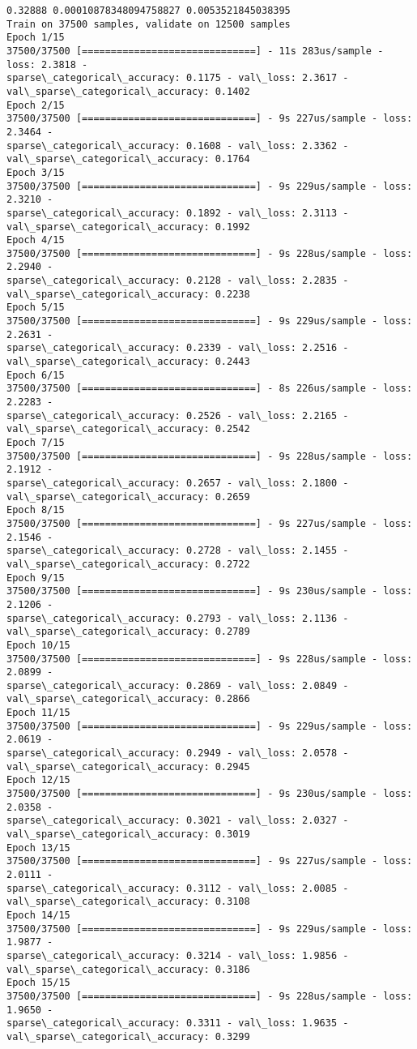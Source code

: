 \documentclass[11pt]{article}
\begin{document}
    \begin{Verbatim}[commandchars=\\\{\}]
0.32888 0.00010878348094758827 0.0053521845038395
Train on 37500 samples, validate on 12500 samples
Epoch 1/15
37500/37500 [==============================] - 11s 283us/sample - loss: 2.3818 -
sparse\_categorical\_accuracy: 0.1175 - val\_loss: 2.3617 -
val\_sparse\_categorical\_accuracy: 0.1402
Epoch 2/15
37500/37500 [==============================] - 9s 227us/sample - loss: 2.3464 -
sparse\_categorical\_accuracy: 0.1608 - val\_loss: 2.3362 -
val\_sparse\_categorical\_accuracy: 0.1764
Epoch 3/15
37500/37500 [==============================] - 9s 229us/sample - loss: 2.3210 -
sparse\_categorical\_accuracy: 0.1892 - val\_loss: 2.3113 -
val\_sparse\_categorical\_accuracy: 0.1992
Epoch 4/15
37500/37500 [==============================] - 9s 228us/sample - loss: 2.2940 -
sparse\_categorical\_accuracy: 0.2128 - val\_loss: 2.2835 -
val\_sparse\_categorical\_accuracy: 0.2238
Epoch 5/15
37500/37500 [==============================] - 9s 229us/sample - loss: 2.2631 -
sparse\_categorical\_accuracy: 0.2339 - val\_loss: 2.2516 -
val\_sparse\_categorical\_accuracy: 0.2443
Epoch 6/15
37500/37500 [==============================] - 8s 226us/sample - loss: 2.2283 -
sparse\_categorical\_accuracy: 0.2526 - val\_loss: 2.2165 -
val\_sparse\_categorical\_accuracy: 0.2542
Epoch 7/15
37500/37500 [==============================] - 9s 228us/sample - loss: 2.1912 -
sparse\_categorical\_accuracy: 0.2657 - val\_loss: 2.1800 -
val\_sparse\_categorical\_accuracy: 0.2659
Epoch 8/15
37500/37500 [==============================] - 9s 227us/sample - loss: 2.1546 -
sparse\_categorical\_accuracy: 0.2728 - val\_loss: 2.1455 -
val\_sparse\_categorical\_accuracy: 0.2722
Epoch 9/15
37500/37500 [==============================] - 9s 230us/sample - loss: 2.1206 -
sparse\_categorical\_accuracy: 0.2793 - val\_loss: 2.1136 -
val\_sparse\_categorical\_accuracy: 0.2789
Epoch 10/15
37500/37500 [==============================] - 9s 228us/sample - loss: 2.0899 -
sparse\_categorical\_accuracy: 0.2869 - val\_loss: 2.0849 -
val\_sparse\_categorical\_accuracy: 0.2866
Epoch 11/15
37500/37500 [==============================] - 9s 229us/sample - loss: 2.0619 -
sparse\_categorical\_accuracy: 0.2949 - val\_loss: 2.0578 -
val\_sparse\_categorical\_accuracy: 0.2945
Epoch 12/15
37500/37500 [==============================] - 9s 230us/sample - loss: 2.0358 -
sparse\_categorical\_accuracy: 0.3021 - val\_loss: 2.0327 -
val\_sparse\_categorical\_accuracy: 0.3019
Epoch 13/15
37500/37500 [==============================] - 9s 227us/sample - loss: 2.0111 -
sparse\_categorical\_accuracy: 0.3112 - val\_loss: 2.0085 -
val\_sparse\_categorical\_accuracy: 0.3108
Epoch 14/15
37500/37500 [==============================] - 9s 229us/sample - loss: 1.9877 -
sparse\_categorical\_accuracy: 0.3214 - val\_loss: 1.9856 -
val\_sparse\_categorical\_accuracy: 0.3186
Epoch 15/15
37500/37500 [==============================] - 9s 228us/sample - loss: 1.9650 -
sparse\_categorical\_accuracy: 0.3311 - val\_loss: 1.9635 -
val\_sparse\_categorical\_accuracy: 0.3299
    \end{Verbatim}
\end{document}
